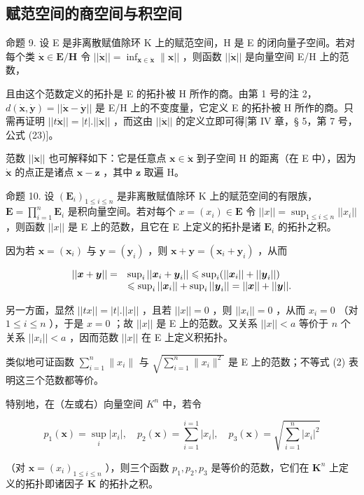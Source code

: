 \subsection{赋范空间的商空间与积空间}

命题 9. 设 E 是非离散赋值除环 K 上的赋范空间，H 是 E 的闭向量子空间。若对每个类 \(\dot{\mathbf{x}}\in\mathbf{E}/\mathbf{H}\) 令 \(||\dot{\mathbf{x}}||=\inf_{\mathbf{x}\in\dot{\mathbf{x}}}\|\mathbf{x}||\) ，则函数 \(||\dot{\mathbf{x}}||\) 是向量空间 E/H 上的范数，

且由这个范数定义的拓扑是 E 的拓扑被 H 所作的商。由第 1 号的注 2，\(d(\dot{\boldsymbol{x}}, \dot{\boldsymbol{y}}) = ||\dot{\boldsymbol{x}} - \dot{\boldsymbol{y}}||\) 是 E/H 上的不变度量，它定义 E 的拓扑被 H 所作的商。只需再证明 \(||t\dot{\boldsymbol{x}}|| = |t|.||\dot{\boldsymbol{x}}||\) ，而这由 \(||\dot{\boldsymbol{x}}||\) 的定义立即可得{[}第 IV 章，§ 5，第 7 号，公式 (23){]}。

范数 \(||\dot{\pmb{x}}||\) 也可解释如下：它是任意点 \(\pmb{x} \in \dot{\pmb{x}}\) 到子空间 H 的距离（在 E 中），因为 \(\dot{\pmb{x}}\) 的点正是诸点 \(\pmb{x} - \pmb{z}\) ，其中 \(\pmb{z}\) 取遍 H。

命题 10. 设 \((\mathbf{E}_i)_{1 \leqslant i \leqslant n}\) 是非离散赋值除环 K 上的赋范空间的有限族，\(\mathbf{E} = \prod_{i=1}^{n} \mathbf{E}_i\) 是积向量空间。若对每个 \(x = (x_i) \in \mathbf{E}\) 令 \(||x|| = \sup_{1 \leqslant i \leqslant n} ||x_i||\) ，则函数 \(||x||\) 是 E 上的范数，且它在 E 上定义的拓扑是诸 \(\mathbf{E}_i\) 的拓扑之积。

因为若 \(\pmb{x} = (\pmb{x}_i)\) 与 \(\pmb{y} = (\pmb{y}_i)\) ，则 \(\pmb{x} + \pmb{y} = (\pmb{x}_i + \pmb{y}_i)\) ，从而

\[
\begin{array}{r l} | | \boldsymbol {x} + \boldsymbol {y} | | = & \sup _ {i} | | \boldsymbol {x} _ {i} + \boldsymbol {y} _ {i} | | \leqslant \sup _ {i} (| | \boldsymbol {x} _ {i} | | + | | \boldsymbol {y} _ {i} | |) \\ & \leqslant \sup _ {i} | | \boldsymbol {x} _ {i} | | + \sup _ {i} | | \boldsymbol {y} _ {i} | | = | | \boldsymbol {x} | | + | | \boldsymbol {y} | |. \end{array}
\]

另一方面，显然 \(||tx|| = |t|.||x||\) ，且若 \(||x|| = 0\) ，则 \(||x_i|| = 0\) ，从而 \(x_i = 0\) （对 \(1 \leqslant i \leqslant n\) ），于是 \(x = 0\) ；故 \(||x||\) 是 E 上的范数。又关系 \(||x|| < a\) 等价于 \(n\) 个关系 \(||x_i|| < a\) ，因而范数 \(||x||\) 在 E 上定义积拓扑。

类似地可证函数 \(\sum_{i=1}^{n} \|x_i\|\) 与 \(\sqrt{\sum_{i=1}^{n} \|x_i\|^2}\) 是 E 上的范数；不等式 (2) 表明这三个范数都等价。

特别地，在（左或右）向量空间 \(K^{n}\) 中，若令

\[
p _ {1} (\boldsymbol {x}) = \sup _ {i} | x _ {i} |, \quad p _ {2} (\boldsymbol {x}) = \sum_ {i = 1} ^ {i = 1} | x _ {i} |, \quad p _ {3} (\boldsymbol {x}) = \sqrt {\sum_ {i = 1} ^ {n} | x _ {i} | ^ {2}}
\]

（对 \(\pmb{x} = (x_{i})_{1\leqslant i\leqslant n}\) ），则三个函数 \(p_1, p_2, p_3\) 是等价的范数，它们在 \(\mathbf{K}^n\) 上定义的拓扑即诸因子 \(\mathbf{K}\) 的拓扑之积。

